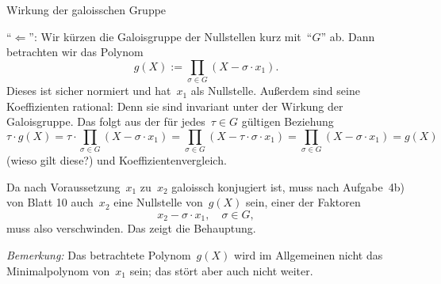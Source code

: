 \documentclass{algblatt}
\begin{document}
\begin{aufgabe}{Wirkung der galoisschen Gruppe}
\begin{loesungE}
"`$\Longleftarrow$"': Wir kürzen die Galoisgruppe der Nullstellen kurz
mit~"`$G$"' ab. Dann betrachten wir das Polynom
\[ g(X) := \prod_{\sigma \in G} (X - \sigma \cdot x_1). \]
Dieses ist sicher normiert und hat~$x_1$ als Nullstelle. Außerdem sind seine
Koeffizienten rational: Denn sie sind invariant unter der Wirkung der
Galoisgruppe. Das folgt aus der für jedes~$\tau \in G$ gültigen Beziehung
\[ \tau \cdot g(X) = \tau \cdot \prod_{\sigma \in G} (X
- \sigma \cdot x_1) = \prod_{\sigma \in G} (X - \tau \cdot
  \sigma \cdot x_1) = \prod_{\sigma \in G} (X
  - \sigma \cdot x_1) = g(X) \]
(wieso gilt diese?) und Koeffizientenvergleich.

Da nach Voraussetzung~$x_1$ zu~$x_2$ galoissch konjugiert ist, muss nach
Aufgabe~4b) von Blatt 10 auch~$x_2$ eine Nullstelle von~$g(X)$ sein, einer der
Faktoren
\[ x_2 - \sigma \cdot x_1, \quad \sigma \in G, \]
muss also verschwinden. Das zeigt die Behauptung.

\emph{Bemerkung:} Das betrachtete Polynom~$g(X)$ wird im Allgemeinen nicht das
Minimalpolynom von~$x_1$ sein; das stört aber auch nicht weiter.
\end{loesungE}
\end{aufgabe}
\end{document}
